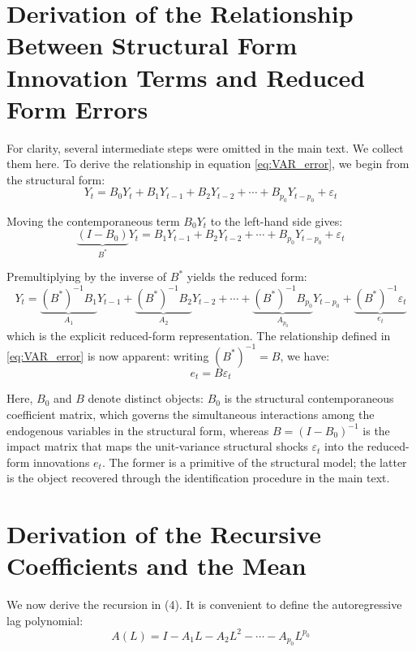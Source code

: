 \documentclass[12pt, a4paper]{article}
\begin{document}
\section{Derivation of the Relationship Between Structural Form Innovation Terms and Reduced Form Errors}

For clarity, several intermediate steps were omitted in the main text. We collect them here. To derive the relationship in equation \eqref{eq:VAR_error}, we begin from the structural form:
\begin{equation}
Y_t = B_0Y_t + B_1Y_{t-1} + B_2Y_{t-2} + \cdots + B_{p_0}Y_{t-p_0} + \varepsilon_t  
\end{equation}

Moving the contemporaneous term $B_0Y_t$ to the left-hand side gives:
\begin{equation}
\underbrace{(I-B_0)}_{B^*}Y_t = B_1Y_{t-1} + B_2Y_{t-2} + \cdots + B_{p_0}Y_{t-p_0} + \varepsilon_t  
\end{equation}

Premultiplying by the inverse of $B^*$ yields the reduced form:
\begin{equation}
Y_t = \underbrace{(B^*)^{-1} B_1}_{A_1} Y_{t-1} + \underbrace{(B^*)^{-1} B_2}_{A_2} Y_{t-2} + \cdots + \underbrace{(B^*)^{-1} B_{p_0}}_{A_{p_0}} Y_{t-p_0} + \underbrace{(B^*)^{-1} \varepsilon_t}_{e_t}  
\end{equation}
which is the explicit reduced-form representation. The relationship defined in \eqref{eq:VAR_error} is now apparent: writing $(B^*)^{-1} = B$, we have:
\begin{equation}
e_t = B \varepsilon_t  
\end{equation}

Here, $B_0$ and $B$ denote distinct objects: $B_0$ is the structural contemporaneous coefficient matrix, which governs the simultaneous interactions among the endogenous variables in the structural form, whereas $B = (I-B_0)^{-1}$ is the impact matrix that maps the unit-variance structural shocks $\varepsilon_t$ into the reduced-form innovations $e_t$. The former is a primitive of the structural model; the latter is the object recovered through the identification procedure in the main text.

\section{Derivation of the Recursive Coefficients and the Mean}

We now derive the recursion in (4). It is convenient to define the autoregressive lag polynomial: 
\begin{equation}
A(L) = I - A_1L - A_2L^2 - \cdots - A_{p_0}L^{p_0}  
\end{equation}
\end{document}
